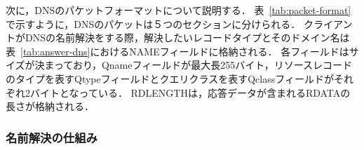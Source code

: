 
次に，DNSのパケットフォーマットについて説明する．
表~\ref{tab:packet-format}で示すように，DNSのパケットは５つのセクションに分けられる．
クライアントがDNSの名前解決をする際，解決したいレコードタイプとそのドメイン名は表~\ref{tab:answer-dns}におけるNAMEフィールドに格納される．
各フィールドはサイズが決まっており，Qnameフィールドが最大長255バイト，リソースレコードのタイプを表すQtypeフィールドとクエリクラスを表すQclassフィールドがそれぞれ2バイトとなっている．
RDLENGTHは，応答データが含まれるRDATAの長さが格納される．


\subsubsection{名前解決の仕組み}
\label{sec:dns-mechanism}


